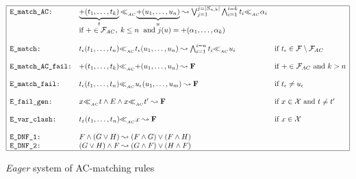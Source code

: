 \documentclass[submission,copyright,creativecommons]{eptcs}
\newcommand \matchth[3]{#1 {\ll}_{{ }_{#3}} {#2}}
\newcommand \matchAC[2]{\matchth{#1}{#2}{AC}}
\numberwithin{subcase}{case}
\begin{document}
 \begin{figure}[hbt!]
\setlength{\abovecaptionskip}{-0.2cm}
\setlength{\belowcaptionskip}{-0.1cm}
\begin{align*}
 \begin{array}{|l  l  l|}
\hline  
\texttt{E\_match\_AC:} 
  & \matchAC{\underbrace{+(t_1,\ldots,t_k)}_{t}}
    {\underbrace{+(u_1,\ldots,u_n)}_{u}}
  \leadsto 
  \bigvee_{j = 1}^{j=|S_{n,k}|} \bigwedge_{i = 1}^{i=k}
  \matchAC{t_i}{\alpha_i} & \\ 
  & \textrm{if } + \in \mathcal{F}_{AC}, \; k\le
  n \; \textrm{ and } j(u)=+(\alpha_1,\ldots,\alpha_k) & \\
&&\\
\texttt{E\_match:}
  & \matchAC{t_{\epsilon}(t_1,\ldots,t_n)}{t_{\epsilon}(u_1,\ldots,u_n)}
  \leadsto \bigwedge_{i = 1}^{i = n}\matchAC{t_i}{u_i}
  & \textrm{if }t_{\epsilon}\in \mathcal{F} \setminus \mathcal{F}_{AC} \\ 
&&\\
\texttt{E\_match\_AC\_fail:} 
  & \matchAC{+(t_1,\ldots,t_k)}{+(u_1,\ldots,u_n)} \leadsto \textbf{F} 
  & \textrm{if } + \in \mathcal{F}_{AC} \textrm{ and } k > n \\ 
&&\\
\texttt{E\_match\_fail:}
  & \matchAC{t_{\epsilon}(t_1,\ldots,t_n)}{u_{\epsilon}(u_1,\ldots,u_m)}
     \leadsto \textbf{F} 
  & \textrm{if } t_{\epsilon}\neq u_{\epsilon} \\ 
&&\\
\texttt{E\_fail\_gen:} 
  & \matchAC{x}{t} \land E \land  \matchAC{x}{t'} \leadsto \textbf{F}  
   & \textrm{if } x\in \mathcal{X} \textrm{ and } t \neq t' \\
&&\\
\texttt{E\_var\_clash:} & \matchAC{t_{\varepsilon}(t_1,\ldots,t_n)}{x}  \leadsto \textbf{F}  & 
 \textrm{if }  x\in \mathcal{X}\\
&&\\
\texttt{E\_DNF\_1:} & F \land (G\lor H) \leadsto (F \land G) \lor (F \land H)&\\
\texttt{E\_DNF\_2:} &  (G\lor H) \land F \leadsto (G \land F) \lor (H \land
F)&\\
\hline
\end{array}
\end{align*}
\caption{\textit{Eager} system of AC-matching rules \label{Eager:Matching-AC}}
\end{figure}
\end{document}
